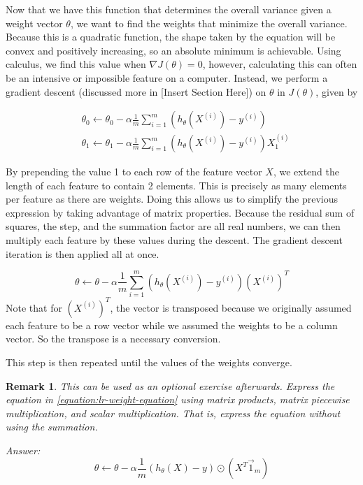 \documentclass{book}[a5paper]
\newcommand{\placeholder}{[Insert Section Here]}
\newtheorem*{remark}{Remark}
\begin{document}
Now that we have this function that determines the overall variance given a
weight vector $\theta$, we want to find the weights that minimize the overall
variance. Because this is a quadratic function, the shape taken by the equation
will be convex and positively increasing, so an absolute minimum is achievable.
Using calculus, we find this value when $\nabla J(\theta)=0$, however,
calculating this can often be an intensive or impossible feature on a computer.
Instead, we perform a gradient descent (discussed more in \placeholder) on
$\theta$ in $J(\theta)$, given by

\begin{align*}
		&\theta_0 \leftarrow \theta_0 - \alpha \frac{1}{m}\sum_{i=1}^m(h_{\theta}(X^{(i)}) - y^{(i)})\\
		&\theta_1 \leftarrow \theta_1 - \alpha
        \frac{1}{m}\sum_{i=1}^m(h_{\theta}(X^{(i)}) - y^{(i)})X_1^{(i)}
\end{align*}

By prepending the value 1 to each row of the feature vector $X$, we extend the
length of each feature to contain 2 elements. This is precisely as many elements
per feature as there are weights. Doing this allows us to simplify the previous
expression by taking advantage of matrix properties. Because the residual sum of
squares, the step, and the summation factor are all real numbers, we can then
multiply each feature by these values during the descent. The gradient descent
iteration is then applied all at once.

\begin{equation}
\label{equation:lr-weight-equation}
    \theta \leftarrow \theta - \alpha
    \frac{1}{m}\sum_{i=1}^{m}(h_{\theta}(X^{(i)}) - y^{(i)})(X^{(i)})^T
\end{equation}
Note that for $(X^{(i)})^T$, the vector is transposed because we originally assumed
each feature to be a row vector while we assumed the weights to be a column
vector. So the transpose is a necessary conversion.

This step is then repeated until the values of the weights converge.

\begin{remark}

    This can be used as an optional exercise afterwards. Express the equation in \ref{equation:lr-weight-equation} using matrix products, matrix piecewise multiplication, and scalar multiplication. That is, express the equation without using the summation.

    Answer:
    \begin{equation*}
        \theta \leftarrow \theta - \alpha \frac{1}{m} (h_{\theta}(X) - y) \odot (X^T\vec{1}_m)
    \end{equation*}
\end{remark}
\end{document}

